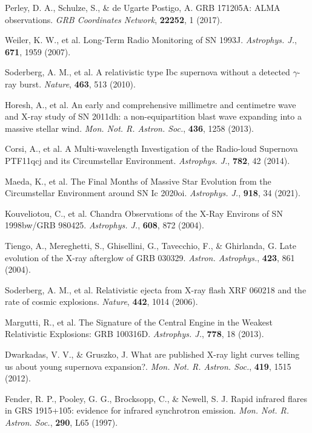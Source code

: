 \documentclass{nature_plusfigure}
\newcommand{\mn}{{Mon. Not. R. Astron. Soc.}}
\newcommand{\mnras}{\mn}
\newcommand{\apj}{{Astrophys. J.}}
\newcommand{\aap}{{Astron. Astrophys.}}
\newcommand{\nat}{{Nature}}
\begin{document}
\begin{methods}
\begin{thebibliography}{10}
 Perley, D. A., Schulze, S., \& de Ugarte Postigo, A. GRB 171205A: ALMA observations. \emph{GRB Coordinates Network}, \textbf{22252}, 1 (2017). 

 Weiler, K. W., et al. Long-Term Radio Monitoring of SN 1993J. \emph{\apj}, \textbf{671}, 1959 (2007). 

 Soderberg, A. M., et al. A relativistic type Ibc supernova without a detected $\gamma$-ray burst. \emph{\nat}, \textbf{463}, 513 (2010). 

 Horesh, A., et al. An early and comprehensive millimetre and centimetre wave and X-ray study of SN 2011dh: a non-equipartition blast wave expanding into a massive stellar wind. \emph{\mnras}, \textbf{436}, 1258 (2013). 

 Corsi, A., et al. A Multi-wavelength Investigation of the Radio-loud Supernova PTF11qcj and its Circumstellar Environment. \emph{\apj}, \textbf{782}, 42 (2014). 

 Maeda, K., et al. The Final Months of Massive Star Evolution from the Circumstellar Environment around SN Ic 2020oi. \emph{\apj}, \textbf{918}, 34 (2021). 

 Kouveliotou, C., et al. Chandra Observations of the X-Ray Environs of SN 1998bw/GRB 980425. \emph{\apj}, \textbf{608}, 872 (2004). 

 Tiengo, A., Mereghetti, S., Ghisellini, G., Tavecchio, F., \& Ghirlanda, G. Late evolution of the X-ray afterglow of GRB 030329. \emph{\aap}, \textbf{423}, 861 (2004). 

 Soderberg, A. M., et al. Relativistic ejecta from X-ray flash XRF 060218 and the rate of cosmic explosions. \emph{\nat}, \textbf{442}, 1014 (2006). 

 Margutti, R., et al. The Signature of the Central Engine in the Weakest Relativistic Explosions: GRB 100316D. \emph{\apj}, \textbf{778}, 18 (2013). 

 Dwarkadas, V. V., \& Gruszko, J. What are published X-ray light curves telling us about young supernova expansion?. \emph{\mnras}, \textbf{419}, 1515 (2012). 



 Fender, R. P., Pooley, G. G., Brocksopp, C., \& Newell, S. J. Rapid infrared flares in GRS 1915+105: evidence for infrared synchrotron emission. \emph{\mnras}, \textbf{290}, L65 (1997). 


\end{thebibliography}
\end{methods}
\end{document}
